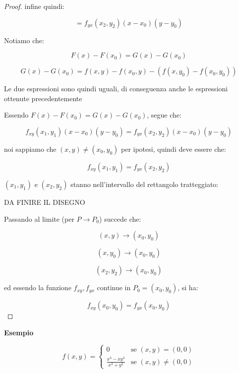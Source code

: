 \documentclass[../appunti-analisi.tex]{subfiles}
\begin{document}
\begin{proof}
       infine quindi:

       \[
           = f_{yx}(x_2,y_2)(x-x_0)(y-y_0)
       \]


       Notiamo che:

       \[
           F(x) - F(x_0) = G(x) -G(x_0)
       \]

       \[
           G(x) - G(x_0) = f(x,y) - f(x_0,y) - (f(x,y_0) -f(x_0,y_0))
       \] 

       Le due espressioni sono quindi uguali, di conseguenza anche le espressioni ottenute precedentemente

       Essendo $F(x) - F(x_0) = G(x) - G(x_0)$, segue che:

       \[
           f_{xy}(x_1,y_1)(x-x_0)(y-y_0) = f_{yx}(x_2,y_2)(x-x_0)(y-y_0)
       \]

       noi sappiamo che $(x,y) \neq (x_0,y_0)$ per ipotesi, quindi deve essere che:

       \[
           f_{xy}(x_1,y_1) = f_{yx}(x_2,y_2)
       \]

       $(x_1,y_1)$ e $(x_2,y_2)$ stanno nell'intervallo del rettangolo tratteggiato:

       DA FINIRE IL DISEGNO


       Passando al limite (per $P \rightarrow P_0$) succede che:

       \[
           (x,y) \rightarrow (x_0,y_0)
       \]

       \[
           (x,y_0) \rightarrow (x_0,y_0)
       \]

       \[
           (x_2,y_2) \rightarrow (x_0,y_0)
       \]

       ed essendo la funzione $f_{xy},f_{yx}$ continue in $P_0=(x_0,y_0)$, si ha:

       \[
           f_{xy}(x_0,y_0) = f_{yx}(x_0,y_0)
       \]


\end{proof}


\textbf{Esempio} 

\[
f(x,y)=\begin{cases}
    0 & \text{se $(x,y) = (0,0)$} \\
    \frac{x^{3}-xy^{3}}{x^{2}+y^{2}} & \text{se $(x,y) \neq (0,0)$}
\end{cases}
\]
\end{document}

